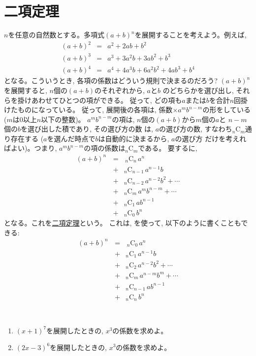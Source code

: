 \section{二項定理}
$n$を任意の自然数とする。多項式$(a+b)^n$を展開することを考えよう。例えば, 
\begin{eqnarray}
(a+b)^2&=&a^2+2ab+b^2\\
(a+b)^3&=&a^3+3a^2b+3ab^2+b^3\\
(a+b)^4&=&a^4+4a^3b+6a^2b^2+4ab^3+b^4
\end{eqnarray}
となる。こういうとき, 各項の係数はどういう規則で決まるのだろう? 
$(a+b)^n$を展開すると, $n$個の$(a+b)$のそれぞれから, $a$と$b$
のどちらかを選び出し, それらを掛けあわせてひとつの項ができる。
従って, どの項も$a$または$b$を合計$n$回掛けたものになっている。
従って, 展開後の各項は, 係数$\times a^mb^{n-m}$の形をしている
($m$は0以上$n$以下の整数)。
$a^mb^{n-m}$の項は, $n$個の$(a+b)$から$m$個の$a$と
$n-m$個の$b$を選び出した積であり, その選び方の数
は, $a$の選び方の数, すなわち$_n$C$_m$通り存在する
($a$を選んだ時点で$b$は自動的に決まるから, $a$の選び方
だけを考えればよい)。つまり, $a^mb^{n-m}$の項の係数は$_n$C$_m$である。
要するに,
\begin{eqnarray}
(a+b)^n\,&=&\,_n\text{C}_n\,a^n\nonumber\\
         &+&_n\text{C}_{n-1}\,a^{n-1}b\nonumber\\
         &+&_n\text{C}_{n-2}\,a^{n-2}b^2+\cdots\nonumber\\
         &+&_n\text{C}_{m}\,a^{m}b^{n-m}+\cdots\nonumber\\
         &+&_n\text{C}_{1}\,ab^{n-1}\nonumber\\
         &+&_n\text{C}_0\,b^n\label{eq:binomth}
\end{eqnarray}
となる。これを\underline{二項定理}という。
これは, を使って, 以下のように書くこともできる:
\begin{eqnarray}
(a+b)^n\,&=&\,_n\text{C}_0\,a^n\nonumber\\
         &+&_n\text{C}_{1}\,a^{n-1}b\nonumber\\
         &+&_n\text{C}_{2}\,a^{n-2}b^2+\cdots\nonumber\\
         &+&_n\text{C}_{m}\,a^{n-m}b^{m}+\cdots\nonumber\\
         &+&_n\text{C}_{n-1}\,ab^{n-1}\nonumber\\
         &+&_n\text{C}_n\,b^n\label{eq:binomth2}
\end{eqnarray}

\begin{q}\label{q:alg_poly_tenkai2}　
\begin{enumerate}
\item $(x+1)^7$を展開したときの, $x^3$の係数を求めよ。
\item $(2x-3)^6$を展開したときの, $x^3$の係数を求めよ。
\end{enumerate}
\end{q}
\mv

